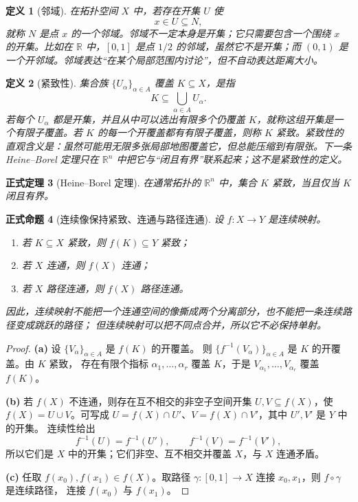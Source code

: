 \documentclass[UTF8,fontset=none,a4paper,11pt]{ctexart}
\theoremstyle{foundation-definition}
\newtheorem{definition}{定义}[section]
\theoremstyle{foundation-theorem}
\newtheorem{theorem}[definition]{正式定理}
\theoremstyle{foundation-proposition}
\newtheorem{proposition}[definition]{正式命题}
\theoremstyle{foundation-example}
\theoremstyle{foundation-remark}
\theoremstyle{foundation-theorem}
\begin{document}
\begin{definition}[邻域]\label{def:neighborhood}
在拓扑空间 \(X\) 中，若存在开集 \(U\) 使
\[
x\in U\subseteq N,
\]
就称 \(N\) 是点 \(x\) 的一个邻域。邻域不一定本身是开集；它只需要包含一个围绕 \(x\) 的开集。比如在 \(\mathbb R\) 中，\([0,1]\) 是点 \(1/2\) 的邻域，虽然它不是开集；而 \((0,1)\) 是一个开邻域。邻域表达“在某个局部范围内讨论”，但不自动表达距离大小。
\end{definition}

\begin{definition}[紧致性]\label{def:compact}
集合族 \(\{U_\alpha\}_{\alpha\in A}\) 覆盖 \(K\subseteq X\)，是指
\[
K\subseteq\bigcup_{\alpha\in A}U_\alpha.
\]
若每个 \(U_\alpha\) 都是开集，并且从中可以选出有限多个仍覆盖 \(K\)，就称这组开集是一个有限子覆盖。若 \(K\) 的每一个开覆盖都有有限子覆盖，则称 \(K\) 紧致。紧致性的直观含义是：虽然可能用无限多张局部地图覆盖它，但总能压缩到有限张。下一条 Heine--Borel 定理只在 \(\mathbb R^n\) 中把它与“闭且有界”联系起来；这不是紧致性的定义。
\end{definition}

\begin{theorem}[Heine--Borel 定理]
在通常拓扑的 \(\mathbb R^n\) 中，集合 \(K\) 紧致，当且仅当 \(K\) 闭且有界。
\end{theorem}

\begin{proposition}[连续像保持紧致、连通与路径连通]\label{prop:continuous-image-compact-connected}
设 \(f:X\to Y\) 是连续映射。
\begin{enumerate}[label=(\alph*)]
  \item 若 \(K\subseteq X\) 紧致，则 \(f(K)\subseteq Y\) 紧致；
  \item 若 \(X\) 连通，则 \(f(X)\) 连通；
  \item 若 \(X\) 路径连通，则 \(f(X)\) 路径连通。
\end{enumerate}
因此，连续映射不能把一个连通空间的像撕成两个分离部分，也不能把一条连续路径变成跳跃的路径；
但连续映射可以把不同点合并，所以它不必保持单射。
\end{proposition}

\begin{proof}
\textbf{(a)} 设 \(\{V_\alpha\}_{\alpha\in A}\) 是 \(f(K)\) 的开覆盖。
则 \(\{f^{-1}(V_\alpha)\}_{\alpha\in A}\) 是 \(K\) 的开覆盖。由 \(K\) 紧致，
存在有限个指标 \(\alpha_1,\ldots,\alpha_r\) 覆盖 \(K\)，于是
\(V_{\alpha_1},\ldots,V_{\alpha_r}\) 覆盖 \(f(K)\)。

\textbf{(b)} 若 \(f(X)\) 不连通，则存在互不相交的非空子空间开集
\(U,V\subseteq f(X)\)，使 \(f(X)=U\cup V\)。可写成
\(U=f(X)\cap U'\)、\(V=f(X)\cap V'\)，其中 \(U',V'\) 是 \(Y\) 中的开集。
连续性给出
\[
f^{-1}(U)=f^{-1}(U'),\qquad f^{-1}(V)=f^{-1}(V'),
\]
所以它们是 \(X\) 中的开集；它们非空、互不相交并覆盖 \(X\)，与 \(X\) 连通矛盾。

\textbf{(c)} 任取 \(f(x_0),f(x_1)\in f(X)\)。取路径
\(\gamma:[0,1]\to X\) 连接 \(x_0,x_1\)，则 \(f\circ\gamma\) 是连续路径，
连接 \(f(x_0)\) 与 \(f(x_1)\)。\end{proof}
\end{document}
